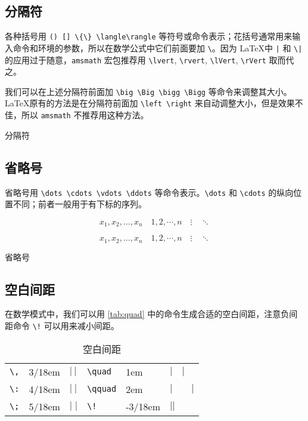 \subsection{分隔符}

各种括号用 \verb|() [] \{\} \langle\rangle| 等符号或命令表示；花括号通常用来输入命令和环境的参数，所以在数学公式中它们前面要加 \verb|\|。因为 \LaTeX 中 \verb+|+ 和 \verb+\|+ 的应用过于随意，\texttt{amsmath} 宏包推荐用 \verb|\lvert|, \verb|\rvert|, \verb|\lVert|, \verb|\rVert| 取而代之。

我们可以在上述分隔符前面加 \verb|\big \Big \bigg \Bigg| 等命令来调整其大小。\LaTeX 原有的方法是在分隔符前面加 \verb|\left \right| 来自动调整大小，但是效果不佳，所以 \texttt{amsmath} 不推荐用这种方法。

\begin{example}[h]
\caption{分隔符}
\label{exa:delimiters}
\end{example}

\subsection{省略号}

省略号用 \verb|\dots \cdots \vdots \ddots| 等命令表示。\verb|\dots| 和 \verb|\cdots| 的纵向位置不同；前者一般用于有下标的序列。

\begin{Code}[]
\[ x_1,x_2,\dots,x_n\quad 1,2,\cdots,n\quad 
  \vdots\quad \ddots \]
\end{Code}

\begin{example}[h]
\begin{Demo}
\[ x_1,x_2,\dots,x_n\quad 1,2,\cdots,n\quad 
  \vdots\quad \ddots \]
\end{Demo}
\caption{省略号}
\label{exa:dots}
\end{example}

\subsection{空白间距}

在数学模式中，我们可以用 \autoref{tab:quad} 中的命令生成合适的空白间距，注意负间距命令 \verb|\!| 可以用来减小间距。

\begin{table}[htbp]
\caption{空白间距}
\label{tab:quad}
\centering
\begin{tabular}{llllll}
  \toprule
  \verb|\,| & 3/18em & $|\,|$ & \verb|\quad| & 1em & $|\quad|$ \\
  \verb|\:| & 4/18em & $|\:|$ & \verb|\qquad| & 2em & $|\qquad|$ \\
  \verb|\;| & 5/18em & $|\;|$ & \verb|\!| & -3/18em & $|\!|$ \\
  \bottomrule
\end{tabular}
\end{table}

